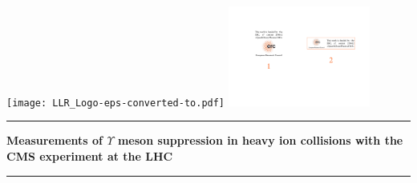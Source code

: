\documentclass[a4paper,11pt,twoside]{StyleThese}
\begin{document}
\begin{vcenterpage}

\vspace*{-4cm}

\hspace{-0.2\textwidth}
\begin{minipage}{1.1\textwidth}
\hspace{0cm}\texttt{[image: LLR\_Logo-eps-converted-to.pdf]}
\hspace{+7.7cm}\includegraphics[width=0.35\textwidth]{erc.pdf}
\end{minipage}
\vspace*{1.5cm}

\hspace{-0.2\textwidth}\begin{minipage}{1.3\textwidth}
\begin{center}
\noindent\rule[2pt]{\textwidth}{0.5pt}
\begin{center}
  {\boldmath\large\textbf{Measurements of $\Upsilon$ meson suppression in heavy ion collisions with the CMS experiment at the LHC\\}}
\end{center}
\noindent\rule[2pt]{\textwidth}{0.5pt}

\end{center}
\end{minipage}

\vspace*{1cm}


\end{vcenterpage}
\end{document}
